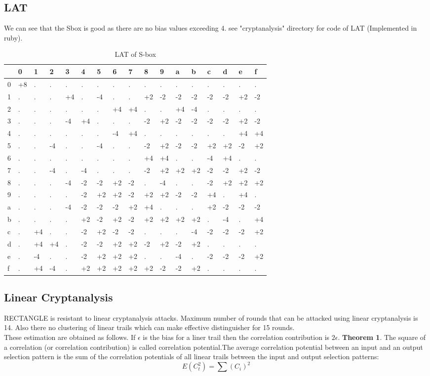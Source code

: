 \documentclass[final]{transcrypto}
\begin{document}
\subsection{LAT}
We can see that the Sbox is good as there are no bias values exceeding 4.
see "cryptanalysis" directory for code of LAT (Implemented in ruby).
\begin{table}[H]
	\centering
	\caption{LAT of S-box}
	\begin{tabular}{|l||l|l|l|l|l|l|l|l|l|l|l|l|l|l|l|l|}
		\hline
&0&1&2&3&4&5&6&7&8&9&a&b&c&d&e&f\\ \hline
\hline
0&+8&.&.&.&.&.&.&.&.&.&.&.&.&.&.&.\\ \hline
1&.&.&.&+4&.&-4&.&.&+2&-2&-2&-2&-2&-2&+2&-2\\ \hline
2&.&.&.&.&.&.&+4&+4&.&.&+4&-4&.&.&.&.\\ \hline
3&.&.&.&-4&+4&.&.&.&-2&+2&-2&-2&-2&-2&+2&-2\\ \hline
4&.&.&.&.&.&.&-4&+4&.&.&.&.&.&.&+4&+4\\ \hline
5&.&.&-4&.&.&-4&.&.&-2&+2&-2&-2&+2&+2&-2&+2\\ \hline
6&.&.&.&.&.&.&.&.&+4&+4&.&.&-4&+4&.&.\\ \hline
7&.&.&-4&.&-4&.&.&.&-2&+2&+2&+2&-2&-2&+2&-2\\ \hline
8&.&.&.&-4&-2&-2&+2&-2&.&-4&.&.&-2&+2&+2&+2\\ \hline
9&.&.&.&.&-2&+2&+2&-2&+2&+2&-2&-2&+4&.&+4&.\\ \hline
a&.&.&.&-4&-2&-2&-2&+2&+4&.&.&.&+2&-2&-2&-2\\ \hline
b&.&.&.&.&+2&-2&+2&-2&+2&+2&+2&+2&.&-4&.&+4\\ \hline
c&.&+4&.&.&-2&+2&-2&-2&.&.&.&-4&-2&-2&-2&+2\\ \hline
d&.&+4&+4&.&-2&-2&+2&+2&-2&+2&-2&+2&.&.&.&.\\ \hline
e&.&-4&.&.&-2&+2&+2&+2&.&.&-4&.&-2&-2&-2&+2\\ \hline
f&.&+4&-4&.&+2&+2&+2&+2&+2&-2&-2&+2&.&.&.&.\\ \hline
	\end{tabular}
\end{table}
\subsection{Linear Cryptanalysis}
RECTANGLE is resistant to linear cryptanalysis attacks. Maximum number of rounds that can be attacked using linear cryptanalysis is 14. Also there no clustering of linear trails which can make effective distinguisher for 15 rounds.\\
These estimation are obtained as follows. If $\epsilon$ is the bias for a liner trail then the correlation contribution is $2\epsilon$.
\textbf{Theorem 1}. The square of a correlation (or correlation contribution) is called correlation potential.The average correlation potential between an input and an output selection pattern is the sum of the correlation potentials of all linear trails between the input and output selection patterns:
$$E(C_t^2) = \sum (C_i)^2$$ 
\end{document}
